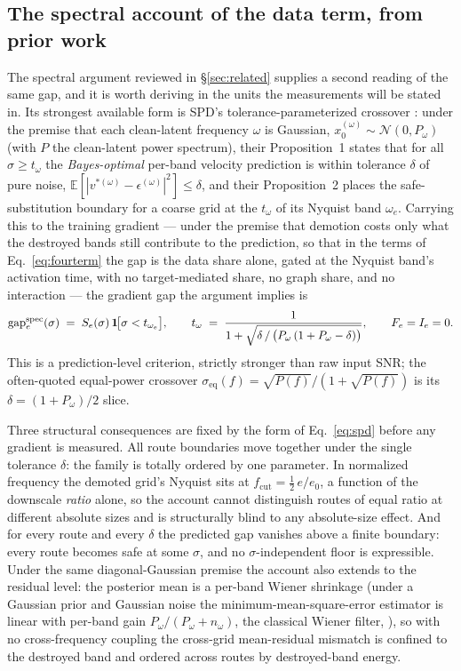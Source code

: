 \subsection{The spectral account of the data term, from prior work}
\label{sec:null}

The spectral argument reviewed in \S\ref{sec:related} supplies a
second reading of the same gap, and it is worth deriving in the units
the measurements will be stated in. Its strongest available form is
SPD's tolerance-parameterized crossover \citep{xiao2026spd}: under
the premise that each clean-latent frequency $\omega$ is Gaussian,
$x_0^{(\omega)} \sim \mathcal{N}(0, P_\omega)$ (with $P$ the
clean-latent power spectrum), their
Proposition~1 states that for all $\sigma \ge t_\omega$ the
\emph{Bayes-optimal} per-band velocity prediction is within tolerance
$\delta$ of pure noise,
$\mathbb{E}[|v^{*(\omega)} - \epsilon^{(\omega)}|^2] \le \delta$, and
their Proposition~2 places the safe-substitution boundary for a coarse
grid at the $t_\omega$ of its Nyquist band $\omega_e$. Carrying this
to the training gradient --- under the premise that demotion costs
only what the destroyed bands still contribute to the prediction, so
that in the terms of Eq.~\ref{eq:fourterm} the gap is the data share
alone, gated at the Nyquist band's activation time, with no
target-mediated share, no graph share, and no interaction --- the
gradient gap the argument implies is
\begin{equation}
\mathrm{gap}_e^{\mathrm{spec}}(\sigma) \;=\;
S_e(\sigma)\,\mathbf{1}\!\big[\sigma < t_{\omega_e}\big],
\qquad
t_\omega \;=\;
\frac{1}{1 + \sqrt{\delta \,/\, \big(P_\omega\,(1 + P_\omega -
\delta)\big)}},
\qquad
F_e = I_e = 0.
\label{eq:spd}
\end{equation}
This is a prediction-level criterion, strictly stronger than raw input
SNR; the often-quoted equal-power crossover
$\sigma_{\mathrm{eq}}(f) = \sqrt{P(f)}/(1+\sqrt{P(f)})$ is its
$\delta = (1+P_\omega)/2$ slice.

Three structural consequences are fixed by the form of
Eq.~\ref{eq:spd} before any gradient is measured. All route
boundaries move together under the single tolerance $\delta$: the
family is totally ordered by one parameter. In normalized frequency
the demoted grid's Nyquist sits at
$f_{\mathrm{cut}} = \tfrac{1}{2}\,e/e_0$, a function of the downscale
\emph{ratio} alone, so the account cannot distinguish routes of equal
ratio at different absolute sizes and is structurally blind to any
absolute-size effect. And for every route and every $\delta$ the
predicted gap vanishes above a finite boundary: every route becomes
safe at some $\sigma$, and no $\sigma$-independent floor is
expressible. Under the same diagonal-Gaussian premise the account
also extends to the residual level: the posterior mean is a per-band
Wiener shrinkage
(under a Gaussian prior and Gaussian noise the minimum-mean-square-error
estimator is linear with per-band gain $P_\omega/(P_\omega + n_\omega)$,
the classical Wiener filter, \citealp{wiener1949}), so with
no cross-frequency coupling the cross-grid mean-residual mismatch is
confined to the destroyed band and ordered across routes by
destroyed-band energy.

